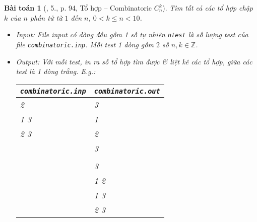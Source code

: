 \documentclass{article}
\newtheorem{baitoan}{Bài toán}
\begin{document}
\begin{baitoan}[\cite{VietSTEM2021}, 5., p. 94, Tổ hợp -- Combinatoric $C_n^k$]
	Tìm tất cả các tổ hợp chập $k$ của $n$ phần tử từ $1$ đến $n$, $0 < k\le n < 10$.
	\begin{itemize}
		\item {\sf Input:} File input có dòng đầu gồm 1 số tự nhiên \texttt{ntest} là số lượng test của file \verb|combinatoric.inp|. Mỗi test 1 dòng gồm $2$ số $n,k\in\mathbb{Z}$. 
		\item {\sf Output:} Với mỗi test, in ra số tổ hợp tìm được \& liệt kê các tổ hợp, giữa các test là 1 dòng trắng. E.g.:
		\begin{table}[H]
			\centering
			\begin{tabular}{|l|l|}
				\hline
				\texttt{combinatoric.inp} & \texttt{combinatoric.out} \\
				\hline
				2 & 3 \\
				1 3 & 1 \\
				2 3 & 2 \\
				& 3 \\
				& \\
				& 3 \\
				& 1 2 \\
				& 1 3 \\
				& 2 3 \\
				\hline
			\end{tabular}
		\end{table}
	\end{itemize}
\end{baitoan}
\end{document}
